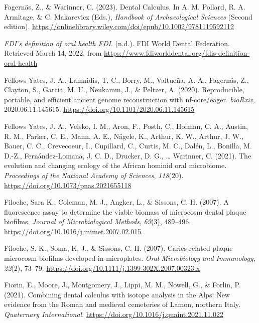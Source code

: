 \documentclass[
  letterpaper,
]{book}
\newlength{\cslhangindent}
\newlength{\cslentryspacingunit} %
\newenvironment{CSLReferences}[2] %
 {%
  \setlength{\parindent}{0pt}
  \ifodd #1
  \let\oldpar\par
  \def\par{\hangindent=\cslhangindent\oldpar}
  \fi
  \setlength{\parskip}{#2\cslentryspacingunit}
 }%
 {}
\begin{document}
\begin{CSLReferences}{1}{0}
\leavevmode{}%
Fagernäs, Z., \& Warinner, C. (2023). Dental {Calculus}. In A. M.
Pollard, R. A. Armitage, \& C. Makarevicz (Eds.), \emph{Handbook of
{Archaeological Sciences}} (Second edition).
\url{https://onlinelibrary.wiley.com/doi/epub/10.1002/9781119592112}

\leavevmode{}%
\emph{{FDI}'s definition of oral health \textbar{} {FDI}}. (n.d.). {FDI
World Dental Federation}. Retrieved March 14, 2022, from
\url{https://www.fdiworlddental.org/fdis-definition-oral-health}

\leavevmode{}%
Fellows Yates, J. A., Lamnidis, T. C., Borry, M., Valtueña, A. A.,
Fagernäs, Z., Clayton, S., Garcia, M. U., Neukamm, J., \& Peltzer, A.
(2020). Reproducible, portable, and efficient ancient genome
reconstruction with nf-core/eager. \emph{bioRxiv}, 2020.06.11.145615.
\url{https://doi.org/10.1101/2020.06.11.145615}

\leavevmode{}%
Fellows Yates, J. A., Velsko, I. M., Aron, F., Posth, C., Hofman, C. A.,
Austin, R. M., Parker, C. E., Mann, A. E., Nägele, K., Arthur, K. W.,
Arthur, J. W., Bauer, C. C., Crevecoeur, I., Cupillard, C., Curtis, M.
C., Dalén, L., Bonilla, M. D.-Z., Fernández-Lomana, J. C. D., Drucker,
D. G., \ldots{} Warinner, C. (2021). The evolution and changing ecology
of the {African} hominid oral microbiome. \emph{Proceedings of the
National Academy of Sciences}, \emph{118}(20).
\url{https://doi.org/10.1073/pnas.2021655118}

\leavevmode{}%
Filoche, Sara K., Coleman, M. J., Angker, L., \& Sissons, C. H. (2007).
A fluorescence assay to determine the viable biomass of microcosm dental
plaque biofilms. \emph{Journal of Microbiological Methods},
\emph{69}(3), 489--496.
\url{https://doi.org/10.1016/j.mimet.2007.02.015}

\leavevmode{}%
Filoche, S. K., Soma, K. J., \& Sissons, C. H. (2007). Caries-related
plaque microcosm biofilms developed in microplates. \emph{Oral
Microbiology and Immunology}, \emph{22}(2), 73--79.
\url{https://doi.org/10.1111/j.1399-302X.2007.00323.x}

\leavevmode{}%
Fiorin, E., Moore, J., Montgomery, J., Lippi, M. M., Nowell, G., \&
Forlin, P. (2021). Combining dental calculus with isotope analysis in
the {Alps}: {New} evidence from the {Roman} and medieval cemeteries of
{Lamon}, northern {Italy}. \emph{Quaternary International}.
\url{https://doi.org/10.1016/j.quaint.2021.11.022}


\end{CSLReferences}
\end{document}
